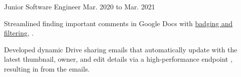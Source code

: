 \begin{cventry}
    {}
    {Junior Software Engineer}
    {Mar. 2020 to Mar. 2021}{}
    \begin{cvitems}
        \item Streamlined finding important comments in Google Docs with \href{https://workspaceupdates.googleblog.com/2021/02/improvements-for-locating-new-comments-important-conversations-google-docs.html}{badging and filtering}, .
        \item Developed dynamic Drive sharing emails that automatically update with the latest thumbnail, owner, and edit details via a high-performance endpoint , resulting in  from the emails.
    \end{cvitems}
\end{cventry}
